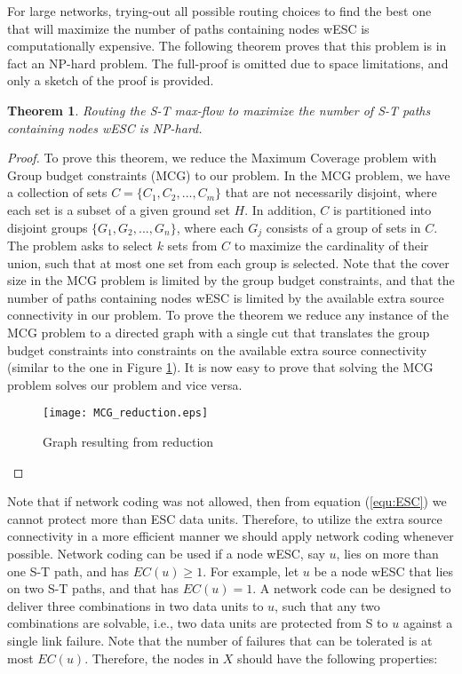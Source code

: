 \documentclass[conference]{IEEEtran}
\newtheorem{theorem}{Theorem}
\newcommand{\refeq}[1]{(\ref{#1})}
\begin{document}
For large networks, trying-out all possible routing choices to find the best one that will maximize the number of paths containing nodes wESC is computationally expensive. The following theorem proves that this problem is in fact an NP-hard problem. The full-proof is omitted due to space limitations, and only a sketch of the proof is provided.

\begin{theorem}
Routing the S-T max-flow to maximize the number of S-T paths containing nodes wESC is NP-hard.
\end{theorem}

\begin{proof}
To prove this theorem, we reduce the Maximum Coverage problem with Group budget constraints (MCG) \cite{CA04} to our problem. In the MCG problem, we have a collection of sets $C=\{C_1, C_2, ..., C_m\}$ that are not necessarily disjoint, where each set is a subset of a given ground set $H$. In addition, $C$ is partitioned into disjoint groups $\{G_1,G_2,...,G_n\}$, where each $G_j$ consists of a group of sets in $C$. The problem asks to select $k$ sets from $C$ to maximize the cardinality of their union, such that at most one set from each group is selected. Note that the cover size in the MCG problem is limited by the group budget constraints, and that the number of paths containing nodes wESC is limited by the available extra source connectivity in our problem. To prove the theorem we reduce any instance of the MCG problem to a directed graph with a single cut that translates the group budget constraints into constraints on the available extra source connectivity (similar to the one in Figure \ref{MCG_reduction}). It is now easy to prove that solving the MCG problem solves our problem and vice versa.  

\begin{figure}[tbh]
\centering
\texttt{[image: MCG\_reduction.eps]}
\caption{Graph resulting from reduction}
\label{MCG_reduction}
\end{figure}

\end{proof}



Note that if network coding was not allowed, then from equation \refeq{equ:ESC} we cannot protect more than ESC data units. Therefore, to utilize the extra source connectivity in a more efficient manner we should apply network coding whenever possible. Network coding can be used if a node wESC, say $u$, lies on more than one S-T path, and has $EC(u) \geq 1$. For example, let $u$ be a node wESC that lies on two S-T paths, and that has $EC(u) = 1$. A network code can be designed to deliver three combinations in two data units to $u$, such that any two combinations are solvable, i.e., two data units are protected from S to $u$ against a single link failure. Note that the number of failures that can be tolerated is at most $EC(u)$. Therefore, the nodes in $X$ should have the following properties:
\end{document}
